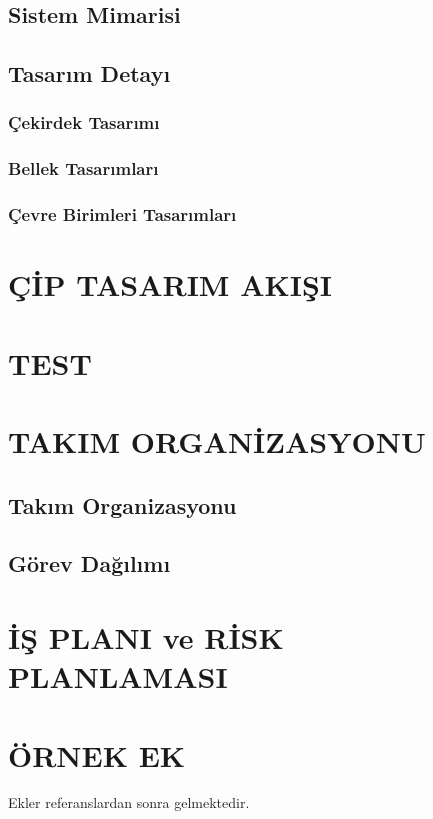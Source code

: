 \documentclass[a4paper,onesided,11pt]{report}
\begin{document}
\section{Sistem Mimarisi}
\label{section:sistem_mimarisi}

\section{Tasarım Detayı}
\label{section:tasarim_detayi}

\subsection{Çekirdek Tasarımı}
\label{subsection:cekirdek_tasarimi}

\subsection{Bellek Tasarımları}
\label{subsection:bellek_tasarimlari}

\subsection{Çevre Birimleri Tasarımları}
\label{subsection:cevre_birimleri_tasarimlari}

\chapter{ÇİP TASARIM AKIŞI}
\label{chapter:cip_tasarim_akisi}

\chapter{TEST}
\label{chapter:test}

\chapter{TAKIM ORGANİZASYONU}
\label{chapter:takim_organizasyonu}

\section{Takım Organizasyonu}
\label{section:takim_organizasyonu}

\section{Görev Dağılımı}
\label{section:gorev_dagilimi}

\chapter{İŞ PLANI ve RİSK PLANLAMASI}
\label{chapter:is_plani_ve_risk_planlamasi}


\renewcommand\bibname{KAYNAKÇA}

\appendix
\chapter[ÖRNEK EK]{ÖRNEK EK}
Ekler referanslardan sonra gelmektedir.
\end{document}
